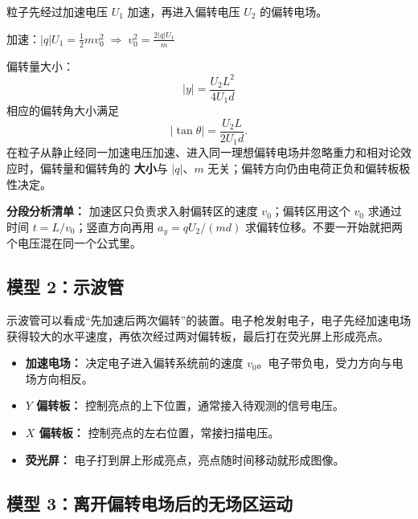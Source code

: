 粒子先经过加速电压 $U_1$ 加速，再进入偏转电压 $U_2$ 的偏转电场。

\begin{center}


\label{fig:accelerate-deflect-model}
\end{center}

加速：$\lvert q\rvert U_1 = \frac12 mv_0^2 \;\Rightarrow\; v_0^2 = \frac{2\lvert q\rvert U_1}{m}$

偏转量大小：
\[
\boxed{|y| = \frac{U_2 L^2}{4U_1 d}}
\]
相应的偏转角大小满足
\[
\boxed{|\tan\theta|=\frac{U_2L}{2U_1d}}.
\]
在粒子从静止经同一加速电压加速、进入同一理想偏转电场并忽略重力和相对论效应时，偏转量和偏转角的
\textbf{大小}与 $|q|$、$m$ 无关；偏转方向仍由电荷正负和偏转板极性决定。

\textbf{分段分析清单：} 加速区只负责求入射偏转区的速度 $v_0$；偏转区用这个 $v_0$ 求通过时间 $t=L/v_0$；竖直方向再用 $a_y=qU_2/(md)$ 求偏转位移。不要一开始就把两个电压混在同一个公式里。

\subsection*{模型 2：示波管}

示波管可以看成“先加速后两次偏转”的装置。电子枪发射电子，电子先经加速电场获得较大的水平速度，再依次经过两对偏转板，最后打在荧光屏上形成亮点。

\begin{center}


\label{fig:oscilloscope-model}
\end{center}

\begin{itemize}
  \item \textbf{加速电场：} 决定电子进入偏转系统前的速度 $v_0$。电子带负电，受力方向与电场方向相反。
  \item \textbf{$Y$ 偏转板：} 控制亮点的上下位置，通常接入待观测的信号电压。
  \item \textbf{$X$ 偏转板：} 控制亮点的左右位置，常接扫描电压。
  \item \textbf{荧光屏：} 电子打到屏上形成亮点，亮点随时间移动就形成图像。
\end{itemize}

\subsection*{模型 3：离开偏转电场后的无场区运动}

